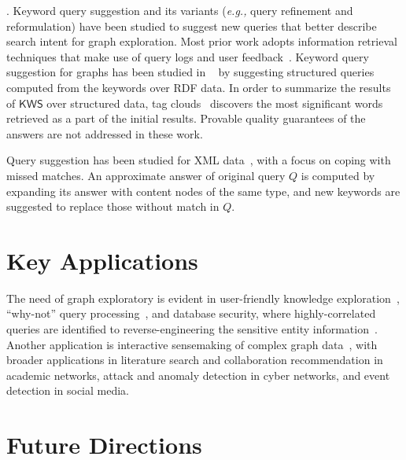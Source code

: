 \documentclass[graybox, natbib, nosecnum, twocolumn]{svmult}
\newcommand{\stitle}[1]{\vspace{1.6ex}\noindent{\bf #1}}
\newcommand{\kw}[1]{{\ensuremath {\mathsf{#1}}}}
\newcommand{\kws}{\kw{KWS}\xspace}
\newcommand{\eg}{\emph{e.g.,}\xspace}
\begin{document}
\stitle{Keyword query suggestion}. 
Keyword query suggestion and its variants 
(\eg query refinement and reformulation) 
have been studied to suggest new queries that better describe search intent 
for graph exploration. 
Most prior work adopts information retrieval techniques that make use of 
query logs and user feedback~\citep{carpineto2012survey}.
Keyword query suggestion for graphs has been studied in ~\citep{tran2009top} by suggesting structured queries computed from the keywords over RDF data. In order to summarize the results of \kws over structured data, tag clouds~\citep{koutrika2009data} discovers the most significant words retrieved as a part of the initial results. 
Provable quality guarantees of the answers are not addressed in these work. 

Query suggestion has been studied 
for XML data~\citep{zeng2014breaking}, 
with a focus on coping with missed matches. An approximate 
answer of original query $Q$ is computed by expanding 
its answer with content nodes of the same type, and 
new keywords are suggested to replace those 
without match in $Q$. 


 



\section{Key Applications}

The need of graph exploratory is evident in user-friendly 
knowledge exploration~\citep{achiezra2010exploratory},  
 ``why-not'' query processing~\citep{tran2010conquer}, and database security, where highly-correlated 
queries are identified to reverse-engineering 
the sensitive entity information~\citep{tran2014query}.
Another application is interactive sensemaking of complex graph data~\citep{pienta2015scalable}, with broader applications in 
literature search and collaboration recommendation 
in academic networks, attack and anomaly detection  
in cyber networks, and event detection in social media. 

\section{Future Directions} 
\end{document}
